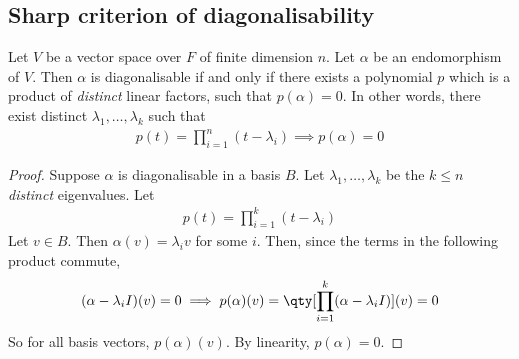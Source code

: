 \subsection{Sharp criterion of diagonalisability}
\begin{theorem}
	Let $V$ be a vector space over $F$ of finite dimension $n$.
	Let $\alpha$ be an endomorphism of $V$.
	Then $\alpha$ is diagonalisable if and only if there exists a polynomial $p$ which is a product of \textit{distinct} linear factors, such that $p(\alpha) = 0$.
	In other words, there exist distinct $\lambda_1, \dots, \lambda_k$ such that
	\begin{align*}
		p(t) = \prod_{i=1}^n (t - \lambda_i) \implies p(\alpha) = 0
	\end{align*}
\end{theorem}
\begin{proof}
	Suppose $\alpha$ is diagonalisable in a basis $B$.
	Let $\lambda_1, \dots, \lambda_k$ be the $k \leq n$ \textit{distinct} eigenvalues.
	Let
	\begin{align*}
		p(t) = \prod_{i=1}^k (t-\lambda_i)
	\end{align*}
	Let $v \in B$.
	Then $\alpha(v) = \lambda_i v$ for some $i$.
	Then, since the terms in the following product commute,
	\begin{align*}
		(\alpha - \lambda_i I)(v) = 0 \implies p(\alpha)(v) = \qty[\prod_{i=1}^k (\alpha - \lambda_i I)](v) = 0
	\end{align*}
	So for all basis vectors, $p(\alpha)(v)$.
	By linearity, $p(\alpha) = 0$.


\end{proof}
